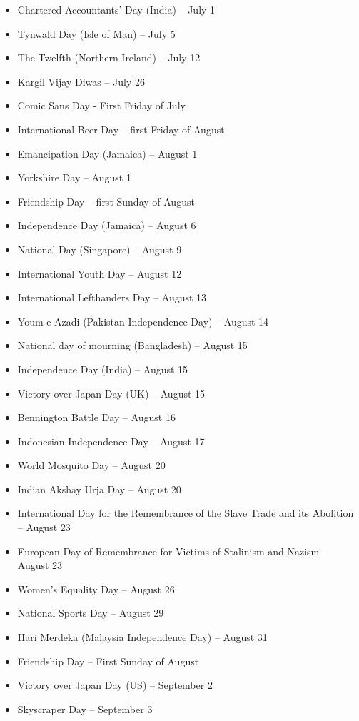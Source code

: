 \documentclass[
  openany]{book}
\begin{document}
\begin{itemize}
\item
  Chartered Accountants' Day (India) -- July 1
\item
  Tynwald Day (Isle of Man) -- July 5
\item
  The Twelfth (Northern Ireland) -- July 12
\item
  Kargil Vijay Diwas -- July 26
\item
  Comic Sans Day - First Friday of July
\item
  International Beer Day -- first Friday of August
\item
  Emancipation Day (Jamaica) -- August 1
\item
  Yorkshire Day -- August 1
\item
  Friendship Day -- first Sunday of August
\item
  Independence Day (Jamaica) -- August 6
\item
  National Day (Singapore) -- August 9
\item
  International Youth Day -- August 12
\item
  International Lefthanders Day -- August 13
\item
  Youm-e-Azadi (Pakistan Independence Day) -- August 14
\item
  National day of mourning (Bangladesh) -- August 15
\item
  Independence Day (India) -- August 15
\item
  Victory over Japan Day (UK) -- August 15
\item
  Bennington Battle Day -- August 16
\item
  Indonesian Independence Day -- August 17
\item
  World Mosquito Day -- August 20
\item
  Indian Akshay Urja Day -- August 20
\item
  International Day for the Remembrance of the Slave Trade and its Abolition -- August 23
\item
  European Day of Remembrance for Victims of Stalinism and Nazism -- August 23
\item
  Women's Equality Day -- August 26
\item
  National Sports Day -- August 29
\item
  Hari Merdeka (Malaysia Independence Day) -- August 31
\item
  Friendship Day -- First Sunday of August
\item
  Victory over Japan Day (US) -- September 2
\item
  Skyscraper Day -- September 3

\end{itemize}
\end{document}
